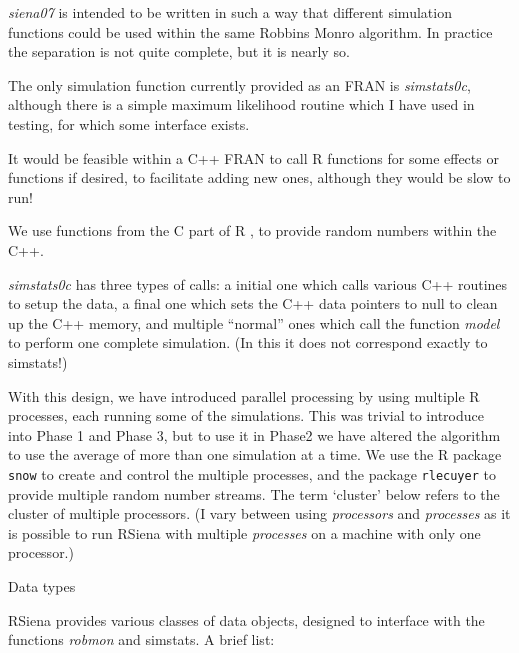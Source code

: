 \documentclass[12pt,a4paper]{article}
\makeatletter
\renewcommand{\=}{\,=\,}
\newcommand{\+}{\,+\,}
\newcommand{\nm}[1]{\textsf{\small #1}}
\newcommand{\nnm}[1]{\textsf{\small\textit{#1}}}
\renewcommand{\section}{\@startsection{section}{1}
                {0pt}{\baselineskip}{0.5\baselineskip}
                {\centering\sffamily} }
\newcommand{\R}{{\sf R }}
\newcommand{\RS}{{\sf RSiena }}
\makeatother
\begin{document}
\nnm{siena07} is intended to be written in such a way that different simulation
functions could be used within the same Robbins Monro algorithm. In practice the
separation is not quite complete, but it is nearly so.

The only simulation function currently provided as an \nm{FRAN} is
\nnm{simstats0c}, although there is a simple maximum likelihood routine which I
have used in testing, for which some interface exists.

It would be feasible within a C++ \nm{FRAN} to call \R functions for some
effects or functions if desired, to facilitate adding new ones, although they
would be slow to run!

We use functions from the C part of \R, to provide random numbers within the
C++.

\nnm{simstats0c} has three types of calls: a initial one which calls various C++
routines to setup the data, a final one which sets the C++ data pointers to null
to clean up the C++ memory, and multiple ``normal'' ones which call the function
\nnm{model} to perform one complete simulation. (In this it does not correspond
exactly to \nm{simstats}!)

With this design, we have introduced parallel processing by using multiple \R
processes, each running some of the simulations. This was trivial to introduce
into Phase 1 and Phase 3, but to use it in Phase2 we have altered the algorithm
to use the average of more than one simulation at a time. We use the \R package
\verb|snow| to create and control the multiple processes, and the package
\verb|rlecuyer| to provide multiple random number streams.  The term `cluster'
below refers to the cluster of multiple processors. (I vary between using
\emph{processors} and \emph{processes} as it is possible to run \RS with
multiple \emph{processes} on a machine with only one processor.)

\section{Data types}

\RS provides various classes of data objects, designed to interface with the
functions \nnm{robmon} and \nm{simstats}. A brief list:
\end{document}

